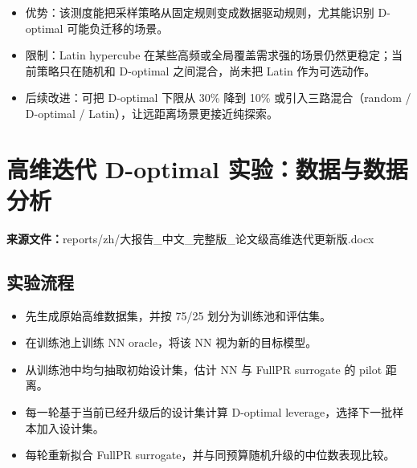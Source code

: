 \documentclass[UTF8,a4paper,11pt]{ctexart}
\begin{document}
\begin{itemize}
\item 优势：该测度能把采样策略从固定规则变成数据驱动规则，尤其能识别 D-optimal 可能负迁移的场景。
\end{itemize}

\begin{itemize}
\item 限制：Latin hypercube 在某些高频或全局覆盖需求强的场景仍然更稳定；当前策略只在随机和 D-optimal 之间混合，尚未把 Latin 作为可选动作。
\end{itemize}

\begin{itemize}
\item 后续改进：可把 D-optimal 下限从 30\% 降到 10\% 或引入三路混合（random / D-optimal / Latin），让远距离场景更接近纯探索。
\end{itemize}

\section{高维迭代 D-optimal 实验：数据与数据分析}
\noindent\textbf{来源文件：}reports/zh/大报告\_中文\_完整版\_论文级高维迭代更新版.docx

\subsection{实验流程}

\begin{itemize}
\item 先生成原始高维数据集，并按 75/25 划分为训练池和评估集。
\end{itemize}

\begin{itemize}
\item 在训练池上训练 NN oracle，将该 NN 视为新的目标模型。
\end{itemize}

\begin{itemize}
\item 从训练池中均匀抽取初始设计集，估计 NN 与 FullPR surrogate 的 pilot 距离。
\end{itemize}

\begin{itemize}
\item 每一轮基于当前已经升级后的设计集计算 D-optimal leverage，选择下一批样本加入设计集。
\end{itemize}

\begin{itemize}
\item 每轮重新拟合 FullPR surrogate，并与同预算随机升级的中位数表现比较。
\end{itemize}
\end{document}
